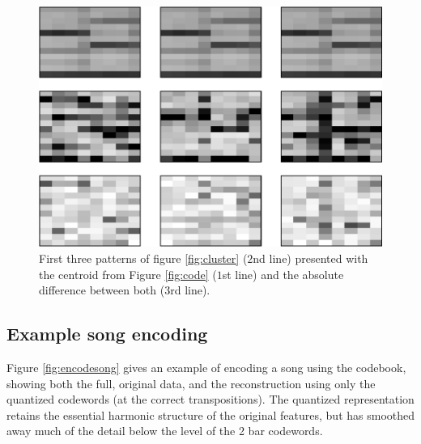 \documentclass{article}
\begin{document}


\begin{figure}[t]
\begin{center}
\includegraphics[width=.95\columnwidth]{close_patterns_diff}
\end{center}
\caption{\small{First three patterns of figure \ref{fig:cluster}
($2$nd line) presented with the centroid from Figure \ref{fig:code}
($1$st line) and the absolute difference between both ($3$rd line).
}}
\label{fig:cluster_diff}
\end{figure}


\subsection{Example song encoding}

Figure \ref{fig:encodesong} gives an example of encoding a song
using the codebook, showing both the full, original data, and the 
reconstruction using only the quantized codewords (at the correct transpositions).  
The quantized representation retains
the essential harmonic structure of the original features, but has smoothed
away much of the detail below the level of the 2 bar codewords.
%
\end{document}
